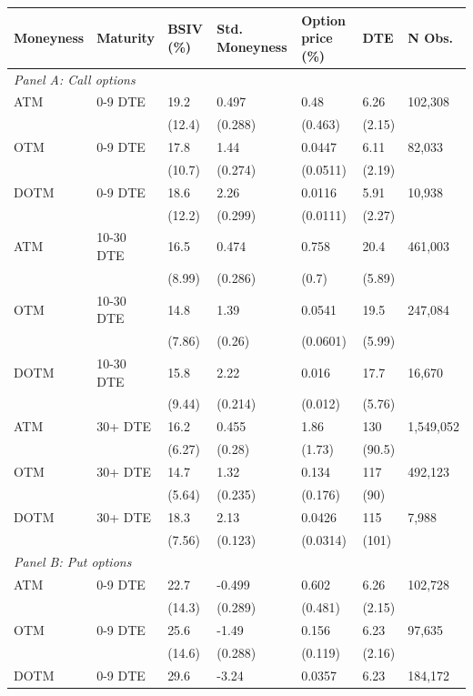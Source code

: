 \documentclass[12pt]{article}
\begin{document}
\begin{table}[!t]
    \centering
\begin{tabular}{lllllll}
\toprule
Moneyness & Maturity & BSIV (\%) & Std. Moneyness & Option price (\%)  & DTE & N Obs. \\
\toprule
\multicolumn{2}{l}{\textit{Panel A: Call options}}  &  &  & &  &    \\ 
ATM & 0-9 DTE & 19.2 & 0.497 & 0.48 & 6.26 & 102,308 \\
 &  & (12.4) & (0.288) & (0.463) & (2.15) &  \\
 OTM & 0-9 DTE & 17.8 & 1.44 & 0.0447 & 6.11 & 82,033 \\
 &  & (10.7) & (0.274) & (0.0511) & (2.19) &  \\
 DOTM & 0-9 DTE & 18.6 & 2.26 & 0.0116 & 5.91 & 10,938 \\
 &  & (12.2) & (0.299) & (0.0111) & (2.27) &  \\
ATM & 10-30 DTE & 16.5 & 0.474 & 0.758 & 20.4 & 461,003 \\
 &  & (8.99) & (0.286) & (0.7) & (5.89) &  \\
OTM & 10-30 DTE & 14.8 & 1.39 & 0.0541 & 19.5 & 247,084 \\
 &  & (7.86) & (0.26) & (0.0601) & (5.99) &  \\
 DOTM & 10-30 DTE & 15.8 & 2.22 & 0.016 & 17.7 & 16,670 \\
 &  & (9.44) & (0.214) & (0.012) & (5.76) &  \\
ATM & 30+ DTE & 16.2 & 0.455 & 1.86 & 130 & 1,549,052 \\
 &  & (6.27) & (0.28) & (1.73) & (90.5) &  \\
OTM & 30+ DTE & 14.7 & 1.32 & 0.134 & 117 & 492,123 \\
 &  & (5.64) & (0.235) & (0.176) & (90) &  \\
DOTM & 30+ DTE & 18.3 & 2.13 & 0.0426 & 115 & 7,988 \\
 &  & (7.56) & (0.123) & (0.0314) & (101) &  \\
 \midrule
\multicolumn{2}{l}{\textit{Panel B: Put options}}  &  &  &  & &      \\
ATM & 0-9 DTE & 22.7 & -0.499 & 0.602 & 6.26 & 102,728 \\
 &  & (14.3) & (0.289) & (0.481) & (2.15) &  \\
  OTM & 0-9 DTE & 25.6 & -1.49 & 0.156 & 6.23 & 97,635 \\
 &  & (14.6) & (0.288) & (0.119) & (2.16) &  \\
 DOTM & 0-9 DTE & 29.6 & -3.24 & 0.0357 & 6.23 & 184,172 \\

\end{tabular}
\end{table}
\end{document}
